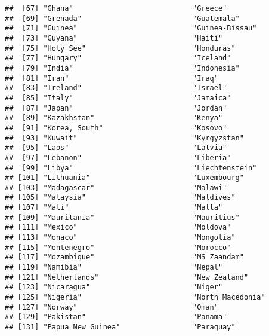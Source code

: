 \documentclass[]{article}
\begin{document}
\begin{verbatim}
##  [67] "Ghana"                            "Greece"                          
##  [69] "Grenada"                          "Guatemala"                       
##  [71] "Guinea"                           "Guinea-Bissau"                   
##  [73] "Guyana"                           "Haiti"                           
##  [75] "Holy See"                         "Honduras"                        
##  [77] "Hungary"                          "Iceland"                         
##  [79] "India"                            "Indonesia"                       
##  [81] "Iran"                             "Iraq"                            
##  [83] "Ireland"                          "Israel"                          
##  [85] "Italy"                            "Jamaica"                         
##  [87] "Japan"                            "Jordan"                          
##  [89] "Kazakhstan"                       "Kenya"                           
##  [91] "Korea, South"                     "Kosovo"                          
##  [93] "Kuwait"                           "Kyrgyzstan"                      
##  [95] "Laos"                             "Latvia"                          
##  [97] "Lebanon"                          "Liberia"                         
##  [99] "Libya"                            "Liechtenstein"                   
## [101] "Lithuania"                        "Luxembourg"                      
## [103] "Madagascar"                       "Malawi"                          
## [105] "Malaysia"                         "Maldives"                        
## [107] "Mali"                             "Malta"                           
## [109] "Mauritania"                       "Mauritius"                       
## [111] "Mexico"                           "Moldova"                         
## [113] "Monaco"                           "Mongolia"                        
## [115] "Montenegro"                       "Morocco"                         
## [117] "Mozambique"                       "MS Zaandam"                      
## [119] "Namibia"                          "Nepal"                           
## [121] "Netherlands"                      "New Zealand"                     
## [123] "Nicaragua"                        "Niger"                           
## [125] "Nigeria"                          "North Macedonia"                 
## [127] "Norway"                           "Oman"                            
## [129] "Pakistan"                         "Panama"                          
## [131] "Papua New Guinea"                 "Paraguay"                        

\end{verbatim}
\end{document}
